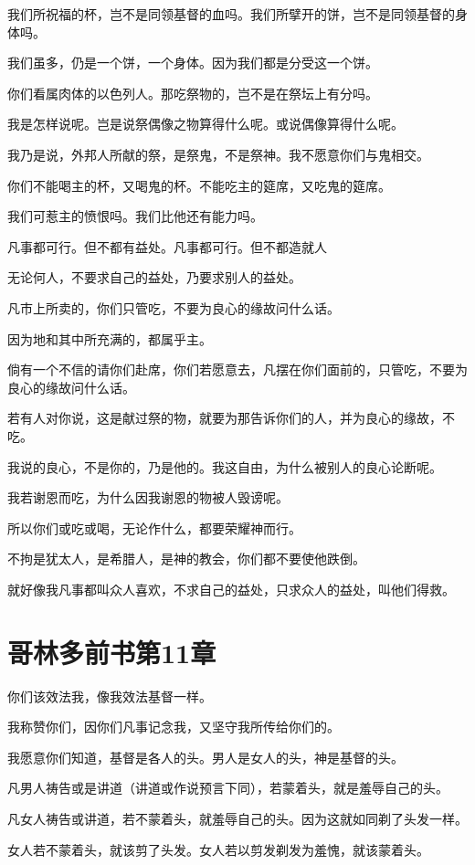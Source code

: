 \documentclass[12pt,oneside]{book}
\begin{document}
我们所祝福的杯，岂不是同领基督的血吗。我们所擘开的饼，岂不是同领基督的身体吗。

我们虽多，仍是一个饼，一个身体。因为我们都是分受这一个饼。

你们看属肉体的以色列人。那吃祭物的，岂不是在祭坛上有分吗。

我是怎样说呢。岂是说祭偶像之物算得什么呢。或说偶像算得什么呢。

我乃是说，外邦人所献的祭，是祭鬼，不是祭神。我不愿意你们与鬼相交。

你们不能喝主的杯，又喝鬼的杯。不能吃主的筵席，又吃鬼的筵席。

我们可惹主的愤恨吗。我们比他还有能力吗。

凡事都可行。但不都有益处。凡事都可行。但不都造就人

无论何人，不要求自己的益处，乃要求别人的益处。

凡市上所卖的，你们只管吃，不要为良心的缘故问什么话。

因为地和其中所充满的，都属乎主。

倘有一个不信的请你们赴席，你们若愿意去，凡摆在你们面前的，只管吃，不要为良心的缘故问什么话。

若有人对你说，这是献过祭的物，就要为那告诉你们的人，并为良心的缘故，不吃。

我说的良心，不是你的，乃是他的。我这自由，为什么被别人的良心论断呢。

我若谢恩而吃，为什么因我谢恩的物被人毁谤呢。

所以你们或吃或喝，无论作什么，都要荣耀神而行。

不拘是犹太人，是希腊人，是神的教会，你们都不要使他跌倒。

就好像我凡事都叫众人喜欢，不求自己的益处，只求众人的益处，叫他们得救。

\chapter{哥林多前书第11章}
你们该效法我，像我效法基督一样。

我称赞你们，因你们凡事记念我，又坚守我所传给你们的。

我愿意你们知道，基督是各人的头。男人是女人的头，神是基督的头。

凡男人祷告或是讲道（讲道或作说预言下同），若蒙着头，就是羞辱自己的头。

凡女人祷告或讲道，若不蒙着头，就羞辱自己的头。因为这就如同剃了头发一样。

女人若不蒙着头，就该剪了头发。女人若以剪发剃发为羞愧，就该蒙着头。
\end{document}
